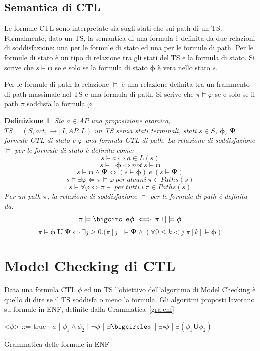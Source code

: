 \documentclass[a4paper, 10pt]{article}
\newtheorem{defn}{Definizione}
\numberwithin{equation}{theor}
\begin{document}
\subsection{Semantica di \ac{CTL}}

Le formule \ac{CTL} sono interpretate sia sugli stati che sui path di un \ac{TS}. Formalmente, dato un \ac{TS}, la semantica di una formula è definita da due relazioni di soddisfazione: una per le formule di stato ed una per le formule di path.
Per le formule di stato è un tipo di relazione tra gli stati del \ac{TS} e la formula di stato. Si scrive che $s \models \boldsymbol{\phi}$ se e solo se la formula di stato $\boldsymbol{\phi}$ è vera nello stato $s$.\par
Per le formule di path la relazione $\models$ è una relazione definita tra un frammento di path massimale nel \ac{TS} e una formula di path. Si scrive che $\pi \models \varphi$ se e solo se il path $\pi$ soddisfa la formula $\varphi$.
\begin{defn}
Sia $a \in AP$ una proposizione atomica, $TS = (S, act, \rightarrow, I, AP, L)$ un \acf{TS} senza stati terminali, stati $s \in S$, $\boldsymbol{\phi}$, $\boldsymbol{\Psi}$ formule \ac{CTL} di stato e $\varphi$ una formula \ac{CTL} di path. La relazione di soddisfazione $\models$ per le formule di stato è definita come:
$$s \models a \iff a \in L(s)$$
$$s \models \neg \boldsymbol{\phi} \iff not\ s \models \boldsymbol{\phi}$$
$$s \models \boldsymbol{\phi} \wedge \boldsymbol{\Psi} \iff (s \models \boldsymbol{\phi})\ e\ (s \models \boldsymbol{\Psi}) $$
$$s \models \exists \varphi \iff \pi \models \varphi\ per\ alcuni\ \pi \in Paths(s)$$
$$s \models \forall \varphi \iff \pi \models\ per\ tutti\ i\ \pi \in Paths(s)$$
Per un path $\pi$, la relazione di soddisfazione $\models$ per le formule di path è definita da:
$$\pi \models \bigcircle \boldsymbol{\phi} \iff \pi[1] \models \boldsymbol{\phi}$$
$$\pi \models \boldsymbol{\phi}\ \boldsymbol{U}\  \boldsymbol{\Psi} \iff \exists j \geqslant 0.(\pi[j] \models \boldsymbol{\Psi} \wedge (\forall 0 \leqslant k < j. \pi[k] \models \boldsymbol{\phi})$$
\end{defn}
\section{Model Checking di \ac{CTL}}
Data una formula \ac{CTL} $\phi$ ed un \ac{TS} l'obiettivo dell'algoritmo di Model Checking è quello di dire se il \ac{TS} soddisfa o meno la formula. Gli algoritmi proposti lavorano su formule in \ac{ENF}, definite dalla Grammatica~\ref{gra:enf}
\begin{Grammar}
	\begin{grammar}

	\centering
	<$\phi$> ::= true | $a$ | $\phi_{1} \wedge \phi_{2}$ | $\neg \phi$ | $\exists\bigcircle\phi$ | $\exists\square\phi$ | $\exists(\phi_{1} \boldsymbol{U} \phi_{2})$

	\end{grammar}
	\caption{Grammatica delle formule in ENF}\label{gra:enf}
\end{Grammar}
\end{document}

